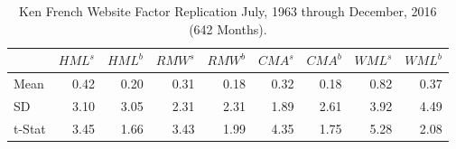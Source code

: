 
\begin{table}[ht]
\centering
\caption{Ken French Website Factor Replication \footnotesize{July, 1963 through December, 2016 (642 Months).}}
\label{tbl:MyFactors}
\begin{tabular}{lD{.}{.}{1.3}D{.}{.}{1.3}D{.}{.}{1.3}D{.}{.}{1.3}D{.}{.}{1.3}D{.}{.}{1.3}D{.}{.}{1.3}D{.}{.}{1.3}}
\toprule
          &  &  &  &  &  &  &  &  \\
\midrule
Mean      & 0.42 & 0.20 & 0.31 & 0.18 & 0.32 & 0.18 & 0.82 & 0.37 \\
SD        & 3.10 & 3.05 & 2.31 & 2.31 & 1.89 & 2.61 & 3.92 & 4.49 \\
t-Stat    & 3.45 & 1.66 & 3.43 & 1.99 & 4.35 & 1.75 & 5.28 & 2.08 \\
\bottomrule
\end{tabular} 
\end{table} 
